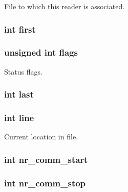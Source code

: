 File to which this reader is associated. \hypertarget{structreader_a6c8ec3c3e77241328358d43697f6f840}{
\subsubsection[{first}]{\setlength{\rightskip}{0pt plus 5cm}int first}}\label{structreader_a6c8ec3c3e77241328358d43697f6f840}
\hypertarget{structreader_ac92588540e8c1d014a08cd8a45462b19}{
\subsubsection[{flags}]{\setlength{\rightskip}{0pt plus 5cm}unsigned int flags}}\label{structreader_ac92588540e8c1d014a08cd8a45462b19}
Status flags. \hypertarget{structreader_a72e27dee31b1c4c6a504fbed29542d97}{
\subsubsection[{last}]{\setlength{\rightskip}{0pt plus 5cm}int last}}\label{structreader_a72e27dee31b1c4c6a504fbed29542d97}
\hypertarget{structreader_a41ebd28ef1d7c6ade45642cb6acc1039}{
\subsubsection[{line}]{\setlength{\rightskip}{0pt plus 5cm}int line}}\label{structreader_a41ebd28ef1d7c6ade45642cb6acc1039}
Current location in file. \hypertarget{structreader_a822654e245dbd5290bc2de1f65e68c98}{
\subsubsection[{nr\-\_\-comm\-\_\-start}]{\setlength{\rightskip}{0pt plus 5cm}int nr\-\_\-comm\-\_\-start}}\label{structreader_a822654e245dbd5290bc2de1f65e68c98}
\hypertarget{structreader_a8f344bd7a0d0c55eaf6dbf32e5e55258}{
\subsubsection[{nr\-\_\-comm\-\_\-stop}]{\setlength{\rightskip}{0pt plus 5cm}int nr\-\_\-comm\-\_\-stop}}\label{structreader_a8f344bd7a0d0c55eaf6dbf32e5e55258}
